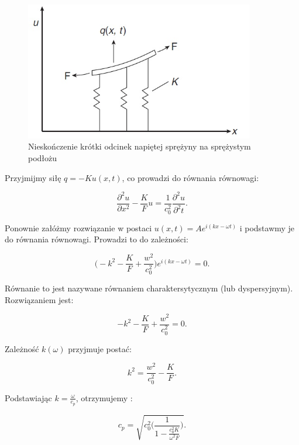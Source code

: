 \begin{figure}[h]
\centering
\includegraphics[width=10cm]{Zdjecia/2/dyspersja_analitycznie_sprezyna2}
\caption{Nieskończenie krótki odcinek napiętej sprężyny na sprężystym podłożu \cite{bartek_rose}}
\label{fig:nieskonczenie_krotki_odcinek_sprezyny2}
\end{figure}

Przyjmijmy siłę \(q=-Ku(x,t)\), co prowadzi do równania równowagi:

\begin{equation}
\frac{\partial^2 u}{\partial x^2} - \frac{K}{F}u = \frac{1}{c_0^2} \frac{\partial^2 u}{\partial^2 t}.
\end{equation}

Ponownie załóżmy rozwiązanie w postaci \( u(x,t)=Ae^{i(kx-\omega t)} \) i podstawmy je do równania równowagi. Prowadzi to do zależności:

\begin{equation}
\Big(-k^2-\frac{K}{F}+\frac{w^2}{c_0^2}\Big)e^{i(kx-\omega t)}=0.
\end{equation}

Równanie to jest nazywane równaniem charaktersytycznym (lub dyspersyjnym). Rozwiązaniem jest:

\begin{equation}
-k^2-\frac{K}{F}+\frac{w^2}{c_0^2}=0.
\end{equation}

Zależność \(k(\omega)\) przyjmuje postać:

\begin{equation}
k^2=\frac{w^2}{c_0^2}-\frac{K}{F}.
\end{equation}

Podstawiając \( k=\frac{\omega}{c_p}\), otrzymujemy :

\begin{equation}
c_p = \sqrt{c_0^2\Bigg( \frac{1}{1 - \frac{c_0^2 K}{\omega^2 F} } \Bigg)}.
\end{equation}

